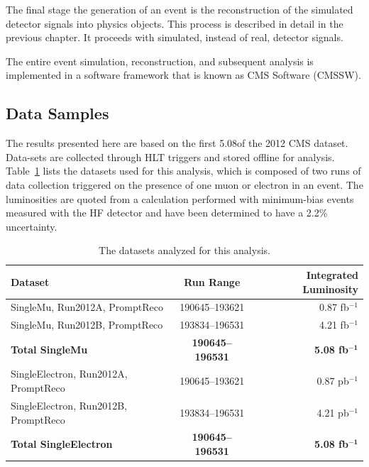 \par The final stage the generation of an event is the reconstruction
of the simulated detector signals into physics objects.  This process
is described in detail in the previous chapter.  It proceeds with
simulated, instead of real, detector signals.  

\par The entire event simulation, reconstruction, and subsequent
analysis is implemented in a software framework that is known as CMS
Software (CMSSW).  

\subsection{Data Samples}
\label{data_overview}

\par The results presented here are based on the first 5.08\fbinv of the
2012 CMS dataset.  Data-sets are collected through HLT triggers and
stored offline for analysis.  Table~\ref{tab:dataSamples} lists the datasets used
for this analysis, which is composed of two runs of data collection
triggered on the presence of one muon or electron in an event.
The luminosities are quoted from a calculation performed with
minimum-bias events measured with the HF detector and have been
determined to have a 2.2\% uncertainty.   

\begin{table}[hbtp]\footnotesize
\centering
\begin{tabular}{|l|c|r|}
\hline\hline
 Dataset & Run Range & Integrated Luminosity \\
\hline
SingleMu, Run2012A, PromptReco & 190645--193621 & 0.87 fb$^{-1}$ \\
SingleMu, Run2012B, PromptReco & 193834--196531 & 4.21 fb$^{-1}$ \\
{\bf Total SingleMu} & {\bf 190645--196531} & {\bf 5.08 fb$\mathbf{^{-1}}$} \\
\hline
SingleElectron, Run2012A, PromptReco & 190645--193621 & 0.87 pb$^{-1}$ \\
SingleElectron, Run2012B, PromptReco & 193834--196531 & 4.21 pb$^{-1}$ \\
{\bf Total SingleElectron} & {\bf 190645--196531} & {\bf 5.08 fb$\mathbf{^{-1}}$} \\
\hline\hline
\end{tabular}
\caption{The datasets analyzed for this analysis.}
\label{tab:dataSamples}
\end{table}

